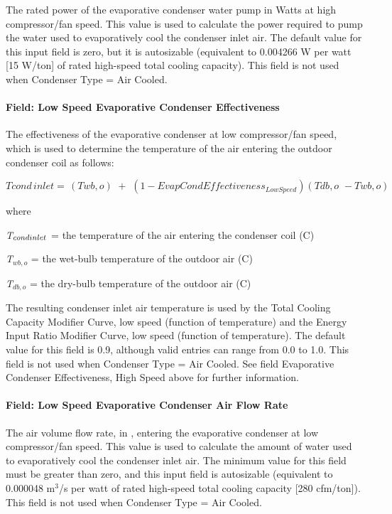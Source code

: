 The rated power of the evaporative condenser water pump in Watts at high compressor/fan speed. This value is used to calculate the power required to pump the water used to evaporatively cool the condenser inlet air. The default value for this input field is zero, but it is autosizable (equivalent to 0.004266 W per watt {[}15 W/ton{]} of rated high-speed total cooling capacity). This field is not used when Condenser Type = Air Cooled.

\paragraph{Field: Low Speed Evaporative Condenser Effectiveness}\label{field-low-speed-evaporative-condenser-effectiveness}

The effectiveness of the evaporative condenser at low compressor/fan speed, which is used to determine the temperature of the air entering the outdoor condenser coil as follows:

\begin{equation}
Tcond\,inlet = \,\left( {Twb,o} \right)\,\, + \,\,\left( {1 - EvapCondEffectivenes{s_{LowSpeed}}} \right)\left( {Tdb,o\,\, - Twb,o} \right)
\end{equation}

where

\emph{T\(_{cond\\ inlet}\)} = the temperature of the air entering the condenser coil (C)

\emph{T\(_{wb,o}\)} = the wet-bulb temperature of the outdoor air (C)

\emph{T\(_{db,o}\)} = the dry-bulb temperature of the outdoor air (C)

The resulting condenser inlet air temperature is used by the Total Cooling Capacity Modifier Curve, low speed (function of temperature) and the Energy Input Ratio Modifier Curve, low speed (function of temperature). The default value for this field is 0.9, although valid entries can range from 0.0 to 1.0. This field is not used when Condenser Type = Air Cooled. See field Evaporative Condenser Effectiveness, High Speed above for further information.

\paragraph{Field: Low Speed Evaporative Condenser Air Flow Rate}\label{field-low-speed-evaporative-condenser-air-flow-rate}

The air volume flow rate, in \si{\volumeFlowRate}, entering the evaporative condenser at low compressor/fan speed. This value is used to calculate the amount of water used to evaporatively cool the condenser inlet air. The minimum value for this field must be greater than zero, and this input field is autosizable (equivalent to 0.000048 m\(^{3}\)/s per watt of rated high-speed total cooling capacity {[}280 cfm/ton{]}). This field is not used when Condenser Type = Air Cooled.

